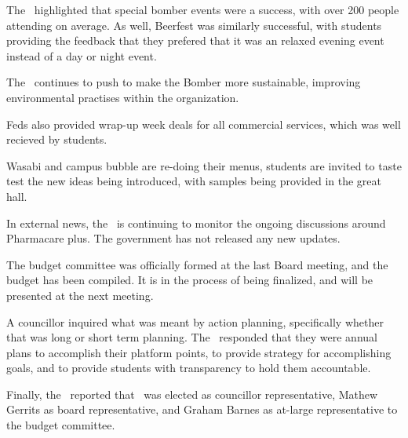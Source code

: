 \begin{information}

    The \vpof\ highlighted that special bomber events were a success, 
    with over 200 people attending on average. As well, Beerfest was similarly
    successful, with students providing the feedback that they prefered that 
    it was an relaxed evening event instead of a day or night event. 

    The \vpof\ continues to push to make the Bomber more sustainable,
    improving environmental practises within the organization. 

    Feds also provided wrap-up week deals for all commercial services,
    which was well recieved by students. 

    Wasabi and campus bubble are re-doing their menus, students are invited
    to taste test the new ideas being introduced, with samples being provided 
    in the great hall. 

    In external news, the \vpof\ is continuing to monitor the ongoing 
    discussions around Pharmacare plus. The government has not released any new
    updates. 

    The budget committee was officially formed at the last Board meeting, 
    and the budget has been compiled. It is in the process of being finalized, 
    and will be presented at the next meeting. 

    A councillor inquired what was meant by action planning, specifically 
    whether that was long or short term planning. The \vpof\ responded that 
    they were annual plans to accomplish their platform points, to provide 
    strategy for accomplishing goals, and to provide students with transparency
    to hold them accountable.  

    Finally, the \vpof\ reported that \seneca\ was elected as councillor 
    representative, Mathew Gerrits as board representative, and Graham Barnes 
    as at-large representative to the budget committee. 

\end{information}

